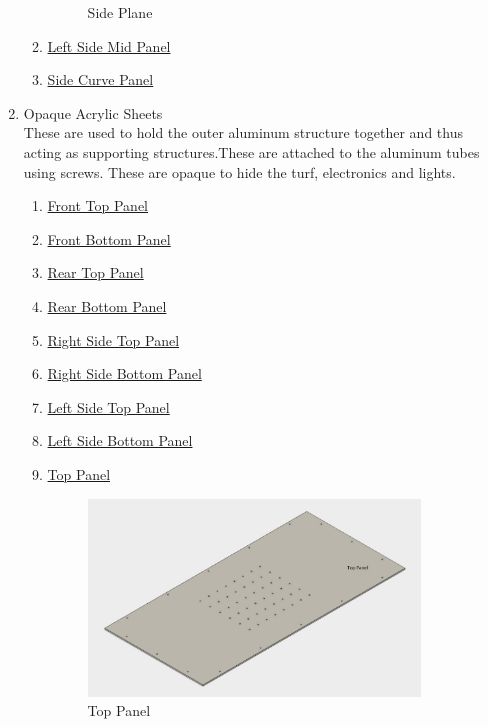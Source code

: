 \documentclass[a4paper,12pt,oneside]{book}
\begin{document}
\begin{enumerate}
\begin{enumerate}
\begin{figure}[h!]
\begin{center}
  \caption{Side Plane}
\end{center}\end{figure}
  \item \href{http://a360.co/2thgj1m}{Left Side Mid Panel}
   \item \href{http://a360.co/2tJ37U7}{Side Curve Panel}
  \end{enumerate}
  \item Opaque Acrylic Sheets\\
  These are used to hold the outer aluminum structure together and thus acting as supporting structures.These are attached to the aluminum tubes using screws. These are opaque to hide the turf, electronics and lights.
  \begin{enumerate}
  \item \href{http://a360.co/2sGEDLo}{Front Top Panel}
  \item \href{http://a360.co/2sqkqoI}{Front Bottom Panel}
  \item \href{http://a360.co/2th6yjx}{Rear Top Panel} 
  \item \href{http://a360.co/2thjbLA}{Rear Bottom Panel}
  \item \href{http://a360.co/2sGqayR}{Right Side Top Panel}  
  \item \href{http://a360.co/2sGInMZ}{Right Side Bottom Panel}
  \item \href{http://a360.co/2sGqayR}{Left Side Top Panel}
  \item \href{http://a360.co/2sGInMZ}{Left Side Bottom Panel}
  \item \href{http://a360.co/2tJ6avt}{Top Panel}\\
  \begin{figure}[h!] \begin{center}
  \includegraphics[width=250pt]{TopPanel}
  \caption{Top Panel}
\end{center}\end{figure}
\begin{figure}[h!]\begin{center}

\end{center}
\end{figure}
\end{enumerate}
\end{enumerate}
\end{document}
